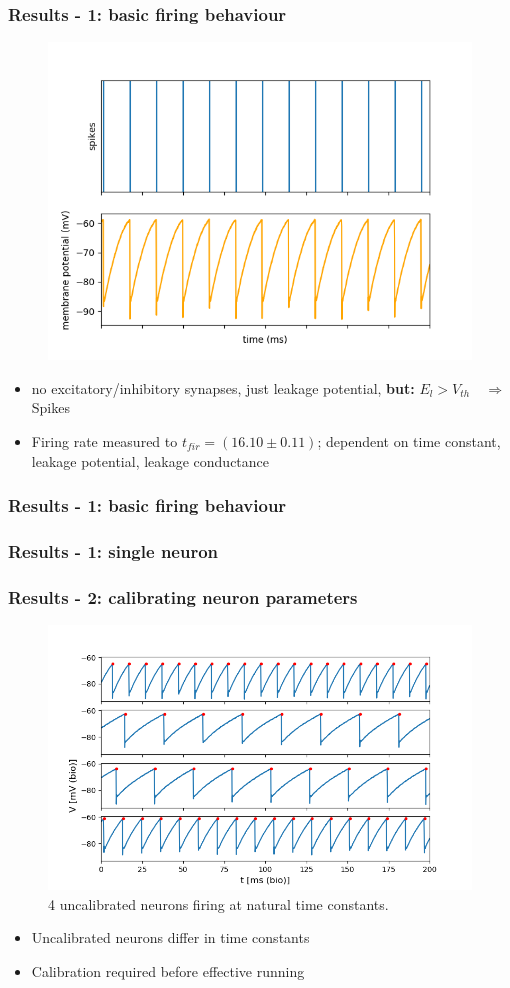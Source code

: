 \documentclass{beamer}
\begin{document}
\begin{frame}
    \frametitle{Results - 1: basic firing behaviour}
    \begin{figure}
    		\centering
    		\includegraphics[width=0.6\linewidth]{figures/fp_task1_1membrane.png}
    \end{figure}

    \begin{itemize}
    		\item no excitatory/inhibitory synapses,  just leakage potential,
    		\textbf{but: } $E_l>V_{th}\quad \Rightarrow$ Spikes
    		\item Firing rate measured to $t_{fir} = (16.10\pm 0.11)$; dependent on
    		time constant, leakage potential,  leakage conductance
    \end{itemize}
\end{frame}

\begin{frame}
    \frametitle{Results - 1: basic firing behaviour}
\end{frame}

\begin{frame}
    \frametitle{Results - 1: single neuron}


\end{frame}

\begin{frame}
    \frametitle{Results - 2: calibrating neuron parameters}
    \begin{figure}
        \includegraphics[width=.7\textwidth]{figures/4membranes.png}
        \caption{4 uncalibrated neurons firing at natural time constants.}
    \end{figure}
    \begin{itemize}
        \item Uncalibrated neurons differ in time constants
        \item Calibration required before effective running
    \end{itemize}
\end{frame}
\end{document}
